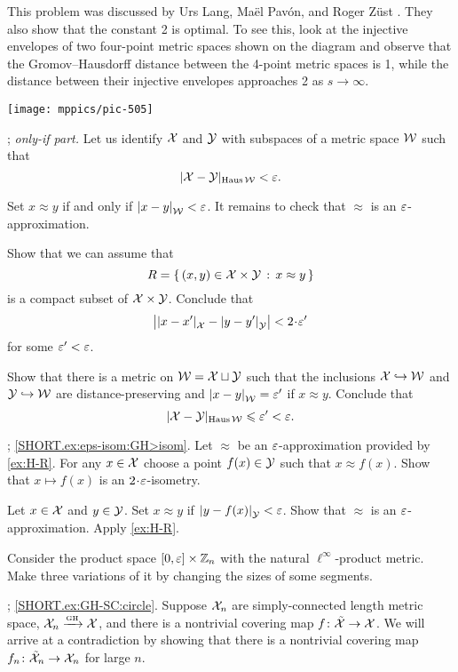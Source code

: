 This problem was discussed by Urs Lang, Maël Pavón, and Roger Züst \cite[3.1]{lang-pavon-zust}.
They also show that the constant 2 is optimal.
To see this, look at the injective envelopes of two four-point metric spaces shown on the diagram and observe that the Gromov--Hausdorff distance between the 4-point metric spaces is 1, while the distance between their injective envelopes approaches 2 as $s\to\infty$. 

\begin{Figure}
\vskip-0mm
\centering
\texttt{[image: mppics/pic-505]}
\end{Figure}

\parbf{\ref{ex:H-R}}; \textit{only-if part.}
Let us identify $\mathcal{X}$ and $\mathcal{Y}$ with subspaces of a metric space $\mathcal{W}$ such that 
\[|\mathcal{X}-\mathcal{Y}|_{\operatorname{\rm Haus}\nolimits \mathcal{W}}<\varepsilon.\]

Set $x\approx y$ if and only if $\dist{x}{y}{\spc{W}}<\eps$.
It remains to check that $\approx$ is an $\varepsilon$-approximation.

Show that we can assume that 
\[R=\left\{\,{(x,y)\in\mathcal{X}\times\mathcal{Y}}\,:\,{x\approx y}\,\right\}\] is a compact subset of $\mathcal{X}\times\mathcal{Y}$.
Conclude that
\[\bigl|\dist{x}{x'}{\spc{X}}-\dist{y}{y'}{\spc{Y}}\bigr|<2\cdot\eps'\]
for some $\varepsilon'<\varepsilon$.

Show that there is a metric on $\mathcal{W}=\mathcal{X}\sqcup\mathcal{Y}$ such that the inclusions $\mathcal{X}\hookrightarrow\mathcal{W}$ and
$\mathcal{Y}\hookrightarrow\mathcal{W}$ are distance-preserving and $\dist{x}{y}{\spc{W}}=\eps'$ if $x\approx y$.
Conclude that 
\[|\mathcal{X}-\mathcal{Y}|_{\operatorname{\rm Haus}\nolimits \mathcal{W}}\leqslant\varepsilon'<\varepsilon.\]

\parbf{\ref{ex:eps-isom}};
\ref{SHORT.ex:eps-isom:GH>isom}.
Let $\approx$ be an $\varepsilon$-approximation provided by \ref{ex:H-R}.
For any $x\in\mathcal{X}$ choose a point $f(x)\in\mathcal{Y}$ such that $x\approx f(x)$.
Show that $x\mapsto f(x)$ is an $2\cdot\eps$-isometry.

Let $x\in\mathcal{X}$ and $y\in\mathcal{Y}$.
Set $x\approx y$ if $\dist{y}{f(x)}{\spc{Y}}<\eps$.
Show that $\approx$ is an $\varepsilon$-approximation. 
Apply \ref{ex:H-R}.

Consider the product space $[0,\varepsilon]\times \mathbb{Z}_n$ with the natural $\ell^\infty$-product metric. 
Make three variations of it by changing the sizes of some segments.

\parbf{\ref{ex:GH-SC}}; \ref{SHORT.ex:GH-SC:circle}.
Suppose $\mathcal{X}_n$ are simply-connected length metric space, $\mathcal{X}_n\xrightarrow{\mbox{\tiny\rm GH}} \mathcal{X}$, and there is a nontrivial covering map $f\colon\tilde{\mathcal{X}}\to \mathcal{X}$.
We will arrive at a contradiction by showing that there is a nontrivial covering map $f_n\colon\tilde{\mathcal{X}}_n\to \mathcal{X}_n$ for large $n$.

